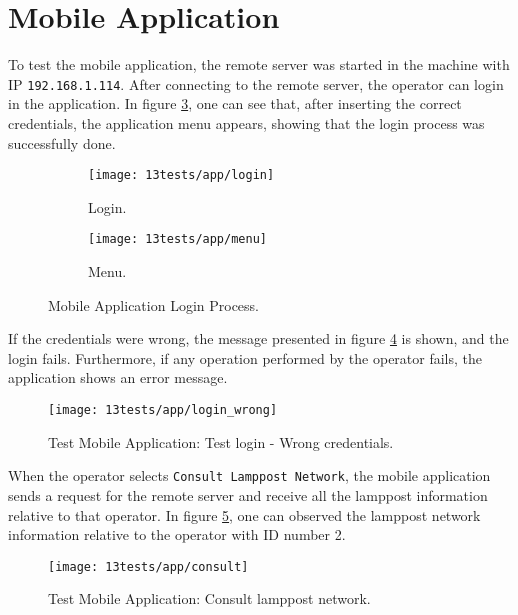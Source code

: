 \clearpage
\section{Mobile Application}

To test the mobile application, the remote server was started in the machine with IP \verb|192.168.1.114|. After connecting to the remote server, the operator can login in the application. In figure \ref{fig:applogin}, one can see that, after inserting the correct credentials, the application menu appears, showing that the login process was successfully done.

\begin{figure}[H]
	\centering
	\begin{subfigure}{.4\textwidth}
		\centering
		\texttt{[image: 13tests/app/login]}
		\caption{Login.}
		\label{fig:login}
	\end{subfigure}%
	\begin{subfigure}{.4\textwidth}
		\centering
		\texttt{[image: 13tests/app/menu]}
		\caption{Menu.}
		\label{fig:menu}
	\end{subfigure}
	\caption{Mobile Application Login Process.}
	\label{fig:applogin}
\end{figure}

If the credentials were wrong, the message presented in figure \ref{fig:login_wrong} is shown, and the login fails. Furthermore, if any operation performed by the operator fails, the application shows an error message.

\begin{figure}[H]
	\centering	
	\texttt{[image: 13tests/app/login\_wrong]}
	\caption{Test Mobile Application: Test login - Wrong credentials.}
	\label{fig:login_wrong}
\end{figure}

When the operator selects \verb|Consult Lamppost Network|, the mobile application sends a request for the remote server and receive all the lamppost information relative to that operator. In figure \ref{fig:consult}, one can observed the lamppost network information relative to the operator with ID number 2.

\begin{figure}[H]
	\centering	
	\texttt{[image: 13tests/app/consult]}
	\caption{Test Mobile Application: Consult lamppost network.}
	\label{fig:consult}
\end{figure}